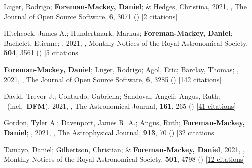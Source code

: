 \item[{\color{numcolor}\scriptsize68}] Luger, Rodrigo; \textbf{Foreman-Mackey, Daniel}; \& Hedges, Christina, 2021, , The Journal of Open Source Software, \textbf{6}, 3071 () [\href{https://ui.adsabs.harvard.edu/abs/2021JOSS....6.3071L}{2 citations}]

\item[{\color{numcolor}\scriptsize67}] Hitchcock, James A.; Hundertmark, Markus; \textbf{Foreman-Mackey, Daniel}; Bachelet, Etienne; \etal, 2021, , Monthly Notices of the Royal Astronomical Society, \textbf{504}, 3561 () [\href{https://ui.adsabs.harvard.edu/abs/2021MNRAS.504.3561H}{5 citations}]

\item[{\color{numcolor}\scriptsize66}] \textbf{Foreman-Mackey, Daniel}; Luger, Rodrigo; Agol, Eric; Barclay, Thomas; \etal, 2021, , The Journal of Open Source Software, \textbf{6}, 3285 () [\href{https://ui.adsabs.harvard.edu/abs/2021JOSS....6.3285F}{142 citations}]

\item[{\color{numcolor}\scriptsize65}] David, Trevor J.; Contardo, Gabriella; Sandoval, Angeli; Angus, Ruth; \etal\ (incl.\ \textbf{DFM}), 2021, , The Astronomical Journal, \textbf{161}, 265 () [\href{https://ui.adsabs.harvard.edu/abs/2021AJ....161..265D}{41 citations}]

\item[{\color{numcolor}\scriptsize64}] Gordon, Tyler A.; Davenport, James R. A.; Angus, Ruth; \textbf{Foreman-Mackey, Daniel}; \etal, 2021, , The Astrophysical Journal, \textbf{913}, 70 () [\href{https://ui.adsabs.harvard.edu/abs/2021ApJ...913...70G}{32 citations}]

\item[{\color{numcolor}\scriptsize63}] Tamayo, Daniel; Gilbertson, Christian; \& \textbf{Foreman-Mackey, Daniel}, 2021, , Monthly Notices of the Royal Astronomical Society, \textbf{501}, 4798 () [\href{https://ui.adsabs.harvard.edu/abs/2021MNRAS.501.4798T}{12 citations}]

